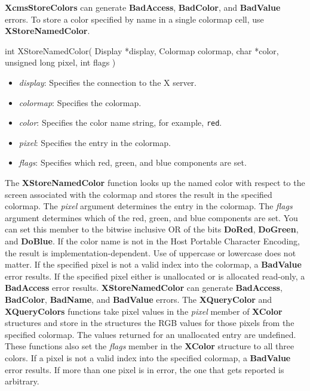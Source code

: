 \documentclass{report}
\begin{document}
\begin{itemize}
            \bigbreak \noindent
            \textbf{XcmsStoreColors} can generate \textbf{BadAccess}, \textbf{BadColor}, and \textbf{BadValue} errors.
            \bigbreak \noindent
            To store a color specified by name in a single colormap cell, use \textbf{XStoreNamedColor}.
            \bigbreak \noindent 
            \begin{cppcode}
                int XStoreNamedColor(
                    Display *display,
                    Colormap colormap,
                    char *color,
                    unsigned long pixel,
                    int flags
                )
            \end{cppcode}
            \begin{itemize}
                \item \textit{display}: Specifies the connection to the X server.
                \item \textit{colormap}: Specifies the colormap.
                \item \textit{color}: Specifies the color name string, for example, \texttt{red}.
                \item \textit{pixel}: Specifies the entry in the colormap.
                \item \textit{flags}: Specifies which red, green, and blue components are set.
            \end{itemize}
            \noindent
            The \textbf{XStoreNamedColor} function looks up the named color with respect to the screen associated with the colormap and stores the result in the specified colormap. The \textit{pixel} argument determines the entry in the colormap. The \textit{flags} argument determines which of the red, green, and blue components are set. You can set this member to the bitwise inclusive OR of the bits \textbf{DoRed}, \textbf{DoGreen}, and \textbf{DoBlue}.
            \bigbreak \noindent
            If the color name is not in the Host Portable Character Encoding, the result is implementation-dependent. Use of uppercase or lowercase does not matter. If the specified pixel is not a valid index into the colormap, a \textbf{BadValue} error results. If the specified pixel either is unallocated or is allocated read-only, a \textbf{BadAccess} error results.
            \bigbreak \noindent
            \textbf{XStoreNamedColor} can generate \textbf{BadAccess}, \textbf{BadColor}, \textbf{BadName}, and \textbf{BadValue} errors.
            \bigbreak \noindent
            The \textbf{XQueryColor} and \textbf{XQueryColors} functions take pixel values in the \textit{pixel} member of \textbf{XColor} structures and store in the structures the RGB values for those pixels from the specified colormap. The values returned for an unallocated entry are undefined. These functions also set the \textit{flags} member in the \textbf{XColor} structure to all three colors. If a pixel is not a valid index into the specified colormap, a \textbf{BadValue} error results. If more than one pixel is in error, the one that gets reported is arbitrary.

\end{itemize}
\end{document}
